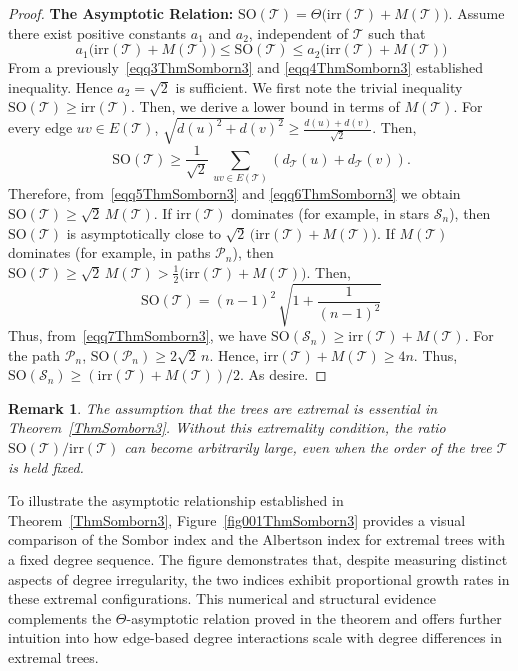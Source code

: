 \documentclass[12pt, a4paper]{article}
\newtheorem{remark}{Remark}
\newcommand{\TT}{\mathcal{T}}
\newcommand{\irr}{\mathrm{irr}}
\newcommand{\SO}{\mathrm{SO}}
\begin{document}
\begin{proof}
\vspace{0.3 cm}
\noindent\textbf{The Asymptotic Relation:} $\SO(\TT)=\Theta\!\bigl(\irr(\TT)+M(\TT)\bigr)$. Assume there exist positive constants $a_1$ and $a_2$, independent of $\TT$ such that
\begin{equation}~\label{eqq5ThmSomborn3}
a_1 \bigl(\irr(\TT)+M(\TT)\bigr) \leqslant \SO(\TT) \leqslant a_2 \bigl(\irr(\TT)+M(\TT)\bigr)
\end{equation}
From a previously~\eqref{eqq3ThmSomborn3} and \eqref{eqq4ThmSomborn3} established inequality. 
Hence $a_2=\sqrt{2}$ is sufficient. We first note the trivial inequality $\SO(\TT) \geqslant \irr(\TT)$.
Then, we derive a lower bound in terms of $M(\TT)$. For every edge $uv \in E(\TT)$, $\sqrt{d(u)^2+d(v)^2}\geqslant \frac{d(u)+d(v)}{\sqrt{2}}$. Then, 
\begin{equation}~\label{eqq6ThmSomborn3}
\SO(\TT)\geqslant \frac{1}{\sqrt{2}}\,\sum_{uv\in E(\TT)}(d_\TT(u)+d_\TT(v)).
\end{equation}
Therefore, from~\eqref{eqq5ThmSomborn3} and \eqref{eqq6ThmSomborn3} we obtain 
$\SO(\TT)\geqslant \sqrt{2}\,M(\TT)$. 
If $\irr(\TT)$ dominates (for example, in stars $\mathcal{S}_n$), then $\SO(\TT)$ is asymptotically close to $\sqrt{2}\,\bigl(\irr(\TT)+M(\TT)\bigr)$. If $M(\TT)$ dominates (for example, in paths $\mathcal{P}_n$), then $\SO(\TT) \geqslant\sqrt{2}\, M(\TT)>\frac{1}{2} \bigl(\irr(\TT)+M(\TT)\bigr)$. Then, 
\begin{equation}~\label{eqq7ThmSomborn3}
\SO(\TT)=(n-1)^2\,\sqrt{1+\frac{1}{(n-1)^2}}
\end{equation}
Thus, from~\eqref{eqq7ThmSomborn3}, we have  $\SO(\mathcal{S}_n)\geqslant \irr(\TT)+M(\TT)$.
For the path $\mathcal{P}_n$, $\SO(\mathcal{P}_n)\geqslant 2\sqrt{2}\,n$.
Hence,  $\irr(\TT)+M(\TT)\geqslant 4n$. Thus, $\SO(\mathcal{S}_n)\geqslant \left(\irr(\TT)+M(\TT)\right)/2$. As desire.
\end{proof}

\begin{remark}
The assumption that the trees are extremal is essential in
Theorem~\ref{ThmSomborn3}. Without this extremality condition, the ratio
$\SO(\TT)/\irr(\TT)$ can become arbitrarily large, even when the order of the tree
$\TT$ is held fixed.
\end{remark}

To illustrate the asymptotic relationship established in Theorem~\ref{ThmSomborn3}, Figure~\ref{fig001ThmSomborn3} provides a visual comparison of the Sombor index and the Albertson index for extremal trees with a fixed degree sequence. The figure demonstrates that, despite measuring distinct aspects of degree irregularity, the two indices exhibit proportional growth rates in these extremal configurations. This numerical and structural evidence complements the $\Theta$-asymptotic relation proved in the theorem and offers further intuition into how edge-based degree interactions scale with degree differences in extremal trees.
\end{document}

